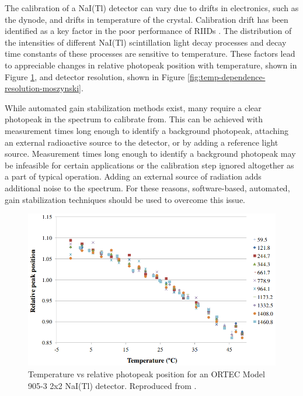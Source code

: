 The calibration of a NaI(Tl) detector can vary due to drifts in electronics, such as the dynode, and drifts in temperature of the crystal. Calibration drift has been identified as a key factor in the poor performance of RIIDs \cite{blackadar2003}. The distribution of the intensities of different NaI(Tl) scintillation light decay processes \cite{IANAKIEV2009432} and decay time constants of these processes \cite{MOSZYNSKI2006739} are sensitive to temperature. These factors lead to appreciable changes in relative photopeak position with temperature, shown in Figure \ref{fig:CASANOVAS2012588}, and detector resolution, shown in Figure \ref{fig:temp-dependence-resolution-moszynski}. 

While automated gain stabilization methods exist, many require a clear photopeak in the spectrum to calibrate from. This can be achieved with measurement times long enough to identify a background photopeak, attaching an external radioactive source to the detector, or by adding a reference light source. Measurement times long enough to identify a background photopeak may be infeasible for certain applications or the calibration step ignored altogether as a part of typical operation. Adding an external source of radiation adds additional noise to the spectrum. For these reasons, software-based, automated, gain stabilization techniques should be used to overcome this issue.

\begin{figure}[H]
\centering
\includegraphics[width=0.95\linewidth]{images/temp_vs_relative_peak_position_CASANOVAS2012588}
\caption{Temperature vs relative photopeak position for an ORTEC Model 905-3 2x2 NaI(Tl) detector.  Reproduced from \cite{CASANOVAS2012588}.}
\label{fig:CASANOVAS2012588}
\end{figure}



